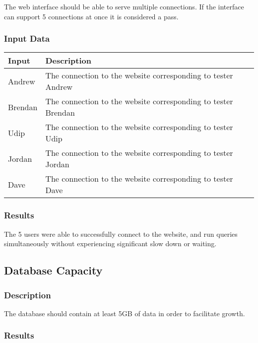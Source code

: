\documentclass{scrreprt}
\begin{document}
The web interface should be able to serve multiple connections. If the
interface can support 5 connections at once it is considered a pass.

\subsubsection{Input Data}
\begin{table}[H]
        \centering
        \begin{tabular}{p{3cm}p{6cm}}
                \hline\hline
                Input & Description\\
                \hline\hline
                Andrew & The connection to the website corresponding to tester Andrew \\
                \hline
                Brendan & The connection to the website corresponding to tester Brendan \\
                \hline
                Udip & The connection to the website corresponding to tester Udip \\
                \hline
                Jordan & The connection to the website corresponding to tester Jordan \\
                \hline
                Dave & The connection to the website corresponding to tester Dave \\
                \hline
        \end{tabular}
\end{table}

\subsubsection{Results}

The 5 users were able to successfully connect to the website, and run queries
simultaneously without experiencing significant slow down or waiting.

\subsection{Database Capacity}
\subsubsection{Description}

The database should contain at least 5GB of data in order to facilitate growth.

\subsubsection{Results}
\end{document}
